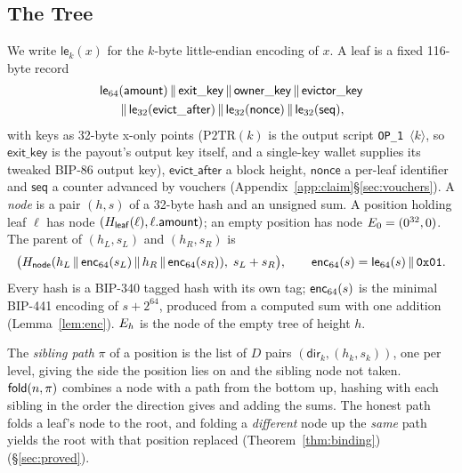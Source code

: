 
\subsection{The Tree}\label{sec:tree}

We write $\mathsf{le}_{k}(x)$ for the $k$-byte little-endian encoding of
$x$. A leaf is a fixed 116-byte record
\begin{multline*}
\mathsf{le}_{64}(\mathsf{amount}) \,\|\, \mathsf{exit\_key} \,\|\, \mathsf{owner\_key}
\,\|\, \mathsf{evictor\_key} \\
\,\|\, \mathsf{le}_{32}(\mathsf{evict\_after})
\,\|\, \mathsf{le}_{32}(\mathsf{nonce}) \,\|\, \mathsf{le}_{32}(\mathsf{seq}),
\end{multline*}
with keys as 32-byte x-only points ($\mathrm{P2TR}(k)$ is the output
script \texttt{OP\_1}~$\langle k \rangle$, so $\mathsf{exit\_key}$ is the
payout's output key itself, and a single-key wallet supplies its tweaked
BIP-86 output key), $\mathsf{evict\_after}$ a block
height, $\mathsf{nonce}$ a per-leaf identifier and $\mathsf{seq}$ a
counter advanced by vouchers (\iffullversion Appendix~\ref{app:claim}\else \S\ref{sec:vouchers}\fi). A \emph{node} is
a pair $(h, s)$ of a 32-byte hash and an unsigned sum. A position holding
leaf $\ell$ has node $(H_{\mathsf{leaf}}(\ell), \ell.\mathsf{amount})$; an empty
position has node $E_0 = (0^{32}, 0)$. The parent of $(h_L, s_L)$ and
$(h_R, s_R)$ is
\[
\bigl(H_{\mathsf{node}}(h_L \,\|\, \mathsf{enc}_{64}(s_L) \,\|\, h_R \,\|\, \mathsf{enc}_{64}(s_R)),\; s_L + s_R\bigr),
\qquad \mathsf{enc}_{64}(s) = \mathsf{le}_{64}(s) \,\|\, \mathtt{0x01}.
\]
Every hash is a BIP-340 tagged hash with its own tag; $\mathsf{enc}_{64}(s)$ is the
minimal BIP-441 encoding of $s + 2^{64}$, produced from a computed sum
with one addition\iffullversion{} (Lemma~\ref{lem:enc})\fi. $E_h$ is the node of the
empty tree of height $h$.

The \emph{sibling path} $\pi$ of a position is the list of $D$ pairs
$(\mathsf{dir}_k, (h_k, s_k))$, one per level, giving the side the
position lies on and the sibling node not taken. $\mathsf{fold}(n, \pi)$ combines
a node with a path from the bottom up, hashing with each sibling in the
order the direction gives and adding the sums. The honest path folds a
leaf's node to the root, and folding a \emph{different} node up the
\emph{same} path yields the root with that position replaced
\iffullversion(Theorem~\ref{thm:binding})\else(\S\ref{sec:proved})\fi.

